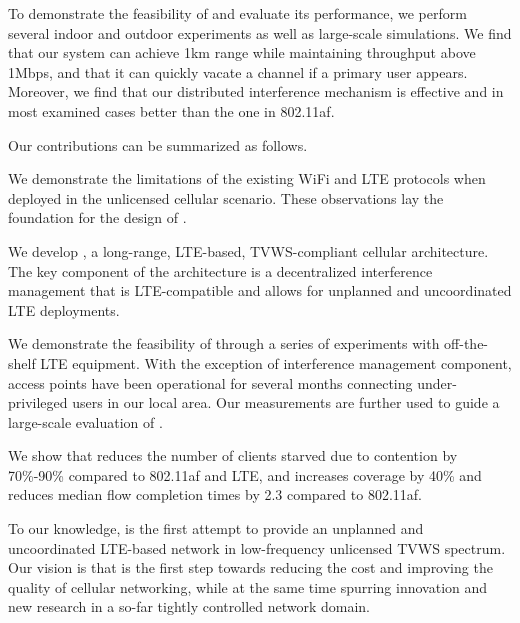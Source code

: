 

To demonstrate the feasibility of \cf and evaluate its performance, 
we perform several indoor and outdoor experiments as well as large-scale simulations. 
We find that our system can achieve 1km range while maintaining throughput above 1Mbps, and that it can quickly vacate a channel if a primary user appears. 
Moreover, we find that our distributed interference mechanism is effective and in most examined cases better than the one in 802.11af.

Our contributions can be summarized as follows. 



\begin{sitemize}
\item We demonstrate the limitations
    of the existing WiFi and LTE protocols when deployed in the unlicensed
  cellular scenario. These observations lay the foundation for the  design of \cf.  
\item We develop \cf, a long-range, LTE-based, TVWS-compliant cellular architecture. The key component of the architecture is a decentralized interference management that is LTE-compatible and allows for unplanned and uncoordinated LTE deployments. 
\item We demonstrate the feasibility of \cf through a series of experiments with off-the-shelf LTE equipment. 
With the exception of interference management component, \cf access points have been operational for several 
months connecting under-privileged users in our local area. Our measurements are further used to guide a large-scale evaluation of \cf. 
\item We show that \cf reduces the number of clients starved due to contention  by 70\%-90\% compared to 802.11af and LTE, and
increases coverage by 40\% and reduces median flow completion times by 2.3 compared to 802.11af.
\end{sitemize}

To our knowledge, \cf is the first attempt to provide an unplanned and uncoordinated LTE-based network in low-frequency unlicensed TVWS spectrum.
Our vision is that \cf is the first step towards reducing the cost and improving the quality of cellular networking, 
while at the same time spurring innovation and new research in a so-far tightly controlled network domain. 



